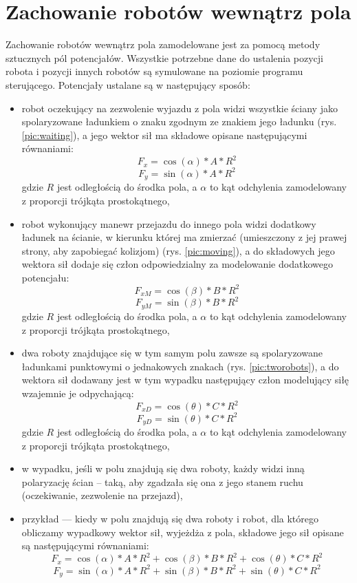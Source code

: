 \section{Zachowanie robotów wewnątrz pola}
	Zachowanie robotów wewnątrz pola zamodelowane jest za pomocą metody sztucznych pól potencjałów.
	Wszystkie potrzebne dane do ustalenia pozycji robota i pozycji innych robotów są symulowane na poziomie programu sterującego.	
	 Potencjały ustalane są w następujący sposób:
	\begin{itemize}
		\item robot oczekujący na zezwolenie wyjazdu z pola widzi wszystkie ściany jako spolaryzowane ładunkiem o znaku zgodnym ze znakiem jego ładunku (rys. \ref{pic:waiting}), a jego wektor sił ma składowe opisane następującymi równaniami:
                $$F_x= \cos(\alpha)*A*R^2$$
		  		$$F_y= \sin(\alpha)*A*R^2$$
		  		gdzie $R$ jest odległością do środka pola, a $\alpha$ to kąt odchylenia zamodelowany z proporcji trójkąta prostokątnego,
		\item robot wykonujący manewr przejazdu do innego pola widzi dodatkowy ładunek na ścianie, w kierunku której ma zmierzać (umieszczony z jej prawej strony, aby zapobiegać kolizjom) (rys. \ref{pic:moving}), a do składowych jego wektora sił dodaje się człon odpowiedzialny za modelowanie dodatkowego potencjału:
                  $$F_{xM}= \cos(\beta)*B*R^2$$
		  		$$F_{yM}= \sin(\beta)*B*R^2$$
		  		gdzie $R$ jest odległością do środka pola, a $\alpha$ to kąt odchylenia zamodelowany z proporcji trójkąta prostokątnego,
		\item dwa roboty znajdujące się w tym samym polu zawsze są spolaryzowane ładunkami punktowymi o jednakowych znakach (rys. \ref{pic:tworobots}), a do wektora sił dodawany jest w tym wypadku następujący człon modelujący siłę wzajemnie je odpychającą:
                  $$F_{xD}= \cos(\theta)*C*R^2$$
		  		$$F_{yD}= \sin(\theta)*C*R^2$$
		  		gdzie $R$ jest odległością do środka pola, a $\alpha$ to kąt odchylenia zamodelowany z proporcji trójkąta prostokątnego,
		\item w wypadku, jeśli w polu znajdują się dwa roboty, każdy widzi inną polaryzację ścian -- taką, aby zgadzała się ona z jego stanem ruchu (oczekiwanie, zezwolenie na przejazd),
                \item przykład --- kiedy w polu znajdują się dwa roboty i robot, dla którego obliczamy wypadkowy wektor sił, wyjeżdża z pola, składowe jego sił opisane są następującymi równaniami:
                $$F_x= \cos(\alpha)*A*R^2+\cos(\beta)*B*R^2+\cos(\theta)*C*R^2$$
		  		$$F_y= \sin(\alpha)*A*R^2+\sin(\beta)*B*R^2+\sin(\theta)*C*R^2$$

	\end{itemize}
	
